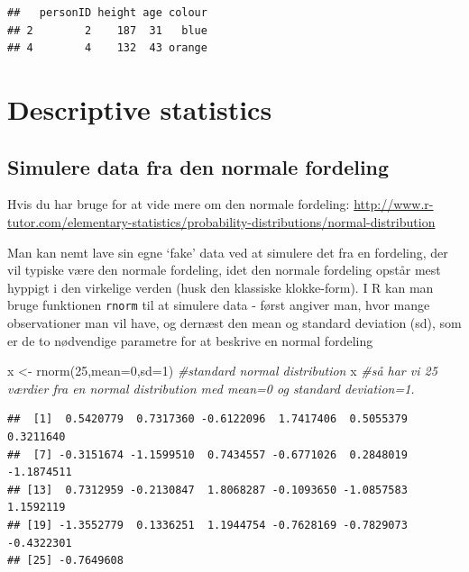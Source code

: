 \documentclass[
]{book}
\newenvironment{Shaded}{\begin{snugshade}}{\end{snugshade}}
\newcommand{\AttributeTok}[1]{\textcolor[rgb]{0.77,0.63,0.00}{#1}}
\newcommand{\CommentTok}[1]{\textcolor[rgb]{0.56,0.35,0.01}{\textit{#1}}}
\newcommand{\DecValTok}[1]{\textcolor[rgb]{0.00,0.00,0.81}{#1}}
\newcommand{\FunctionTok}[1]{\textcolor[rgb]{0.00,0.00,0.00}{#1}}
\newcommand{\NormalTok}[1]{#1}
\newcommand{\OtherTok}[1]{\textcolor[rgb]{0.56,0.35,0.01}{#1}}
\begin{document}
\begin{verbatim}
##   personID height age colour
## 2        2    187  31   blue
## 4        4    132  43 orange
\end{verbatim}

\hypertarget{descriptive-statistics}{%
\section{Descriptive statistics}\label{descriptive-statistics}}

\hypertarget{simulere-data-fra-den-normale-fordeling}{%
\subsection{Simulere data fra den normale fordeling}\label{simulere-data-fra-den-normale-fordeling}}

Hvis du har bruge for at vide mere om den normale fordeling: \url{http://www.r-tutor.com/elementary-statistics/probability-distributions/normal-distribution}

Man kan nemt lave sin egne `fake' data ved at simulere det fra en fordeling, der vil typiske være den normale fordeling, idet den normale fordeling opstår mest hyppigt i den virkelige verden (husk den klassiske klokke-form). I R kan man bruge funktionen \texttt{rnorm} til at simulere data - først angiver man, hvor mange observationer man vil have, og dernæst den mean og standard deviation (sd), som er de to nødvendige parametre for at beskrive en normal fordeling

\begin{Shaded}
\begin{Highlighting}[]
\NormalTok{x }\OtherTok{\textless{}{-}} \FunctionTok{rnorm}\NormalTok{(}\DecValTok{25}\NormalTok{,}\AttributeTok{mean=}\DecValTok{0}\NormalTok{,}\AttributeTok{sd=}\DecValTok{1}\NormalTok{) }\CommentTok{\#standard normal distribution}
\NormalTok{x }\CommentTok{\#så har vi 25 værdier fra en normal distribution med mean=0 og standard deviation=1.}
\end{Highlighting}
\end{Shaded}

\begin{verbatim}
##  [1]  0.5420779  0.7317360 -0.6122096  1.7417406  0.5055379  0.3211640
##  [7] -0.3151674 -1.1599510  0.7434557 -0.6771026  0.2848019 -1.1874511
## [13]  0.7312959 -0.2130847  1.8068287 -0.1093650 -1.0857583  1.1592119
## [19] -1.3552779  0.1336251  1.1944754 -0.7628169 -0.7829073 -0.4322301
## [25] -0.7649608
\end{verbatim}
\end{document}
